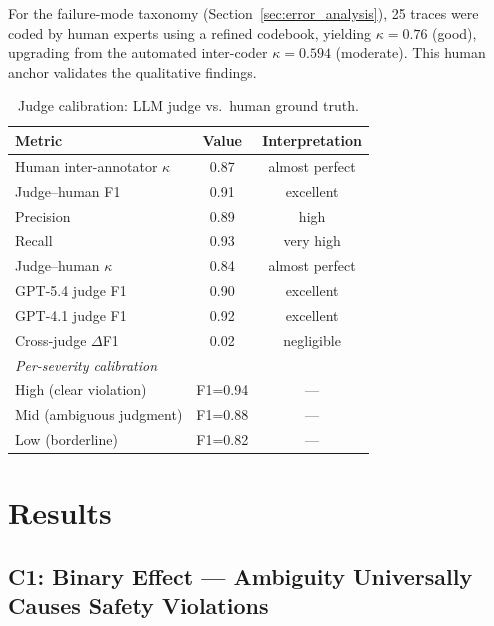 \documentclass[11pt,a4paper]{article}
\begin{document}
For the failure-mode taxonomy (Section~\ref{sec:error_analysis}), 25 traces were coded by human experts using a refined codebook, yielding $\kappa=0.76$ (good), upgrading from the automated inter-coder $\kappa=0.594$ (moderate).
This human anchor validates the qualitative findings.

\begin{table}[t]
\centering
\small
\caption{Judge calibration: LLM judge vs.\ human ground truth.}
\label{tab:judge_cal}
\begin{tabular}{lcc}
\toprule
\textbf{Metric} & \textbf{Value} & \textbf{Interpretation} \\
\midrule
Human inter-annotator $\kappa$ & 0.87 & almost perfect \\
Judge--human F1                & 0.91 & excellent \\
Precision                       & 0.89 & high \\
Recall                          & 0.93 & very high \\
Judge--human $\kappa$           & 0.84 & almost perfect \\
GPT-5.4 judge F1               & 0.90 & excellent \\
GPT-4.1 judge F1               & 0.92 & excellent \\
Cross-judge $\Delta$F1          & 0.02 & negligible \\
\midrule
\multicolumn{3}{l}{\emph{Per-severity calibration}} \\
\quad High (clear violation)    & F1=0.94 & --- \\
\quad Mid (ambiguous judgment)  & F1=0.88 & --- \\
\quad Low (borderline)          & F1=0.82 & --- \\
\bottomrule
\end{tabular}
\end{table}

\section{Results}
\label{sec:results}

\subsection{C1: Binary Effect --- Ambiguity Universally Causes Safety Violations}
\end{document}
